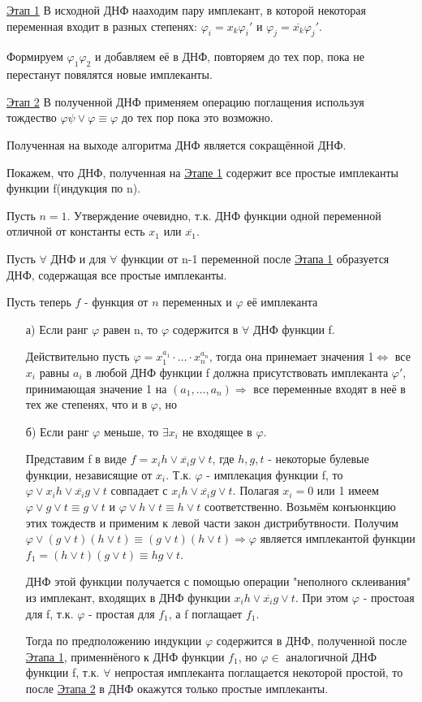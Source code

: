 \underline{Этап 1}
В исходной ДНФ нааходим пару имплекант, в которой некоторая переменная входит в разных степенях: $\varphi_i = x_k\varphi_i'$ и $\varphi_j = \overline{x_k}\varphi_j'$.\par
Формируем $\varphi_1\varphi_2$ и добавляем её в ДНФ, повторяем до тех пор, пока не перестанут повялятся новые имплеканты.

\underline{Этап 2}
В полученной ДНФ применяем операцию поглащения используя тождество $\varphi\psi\vee\varphi\equiv\varphi$ до тех пор пока это возможно.

\thr Полученная на выходе алгоритма ДНФ является сокращённой ДНФ.

\proof Покажем, что ДНФ, полученная на \underline{Этапе 1} содержит все простые имплеканты функции f(индукция по n).\par
Пусть $n=1$. Утверждение очевидно, т.к. ДНФ функции одной переменной отличной от константы есть $x_1$ или $\overline{x_1}$.\par
Пусть $\forall$ ДНФ и для $\forall$ функции от n-1 переменной после \underline{Этапа 1} образуется ДНФ, содержащая все простые имплеканты.\par
Пусть теперь $f$ - функция от $n$ переменных и $\varphi$ её имплеканта 
\begin{itemize}
	\item[а)]Если ранг $\varphi$ равен n, то $\varphi$ содержится в $\forall$ ДНФ функции f.\par
Действительно пусть $\varphi = x_1^{a_1}\cdot \dotsc \cdot x_n^{a_n}$, тогда она принемает значения 1$\Leftrightarrow$ все $x_i$ равны $a_i$ в любой ДНФ функции f должна присутствовать имплеканта $\varphi'$, принимающая значение 1 на $(a_1, \dotsc, a_n) \Rightarrow$ все переменные входят в неё в тех же степенях, что и в $\varphi$, но
	\item[б)]Если ранг $\varphi$ меньше, то $\exists x_i$ не входящее в $\varphi$.\par
Представим f в виде $f=x_ih\vee \overline{x_i}g \vee t$, где $h,g,t$ - некоторые булевые функции, независящие от $x_i$. Т.к. $\varphi$ - имплекация функции f, то $\varphi\vee x_ih\vee \overline{x_i}g\vee t$ совпадает с $x_ih\vee \overline{x_i}g\vee t$. Полагая $x_i = 0$ или 1 имеем $\varphi\vee g\vee t\equiv g\vee t$ и $\varphi\vee h\vee t\equiv h\vee t$ соответственно. Возьмём конъюнкцию этих тождеств и применим к левой части закон дистрибутвности. Получим $\varphi\vee (g\vee t)(h\vee t) \equiv (g\vee t)(h\vee t) \Rightarrow \varphi$ является имплекантой функции $f_1=(h\vee t)(g\vee t)\equiv hg\vee t$.\par ДНФ этой функции получается с помощью операции "неполного склеивания" из имплекант, входящих в ДНФ функции $x_ih\vee \overline{x_i}g \vee t$. При этом $\varphi$ - простоая для f, т.к. $\varphi$ - простая для $f_1$, а f поглащает $f_1$.\par
Тогда по предположению индукции $\varphi$ содержится в ДНФ, полученной после \underline{Этапа 1}, применнёного к ДНФ функции $f_1$, но $\varphi \in$ аналогичной ДНФ функции f, т.к. $\forall$ непростая имплеканта поглащается некоторой простой, то после \underline{Этапа 2} в ДНФ окажутся только простые имплеканты.
\end{itemize}

